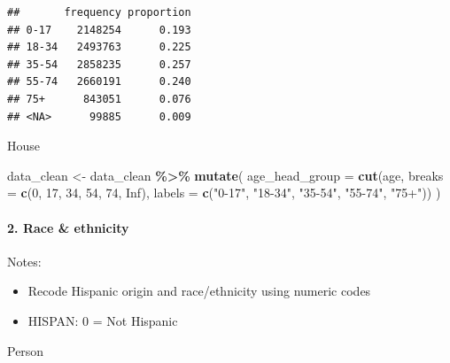 \documentclass[
]{article}
\newenvironment{Shaded}{\begin{snugshade}}{\end{snugshade}}
\newcommand{\AttributeTok}[1]{\textcolor[rgb]{0.13,0.29,0.53}{#1}}
\newcommand{\ConstantTok}[1]{\textcolor[rgb]{0.56,0.35,0.01}{#1}}
\newcommand{\DecValTok}[1]{\textcolor[rgb]{0.00,0.00,0.81}{#1}}
\newcommand{\FunctionTok}[1]{\textcolor[rgb]{0.13,0.29,0.53}{\textbf{#1}}}
\newcommand{\NormalTok}[1]{#1}
\newcommand{\OtherTok}[1]{\textcolor[rgb]{0.56,0.35,0.01}{#1}}
\newcommand{\SpecialCharTok}[1]{\textcolor[rgb]{0.81,0.36,0.00}{\textbf{#1}}}
\newcommand{\StringTok}[1]{\textcolor[rgb]{0.31,0.60,0.02}{#1}}
\providecommand{\tightlist}{%
  \setlength{\itemsep}{0pt}\setlength{\parskip}{0pt}}
\begin{document}
\begin{verbatim}
##       frequency proportion
## 0-17    2148254      0.193
## 18-34   2493763      0.225
## 35-54   2858235      0.257
## 55-74   2660191      0.240
## 75+      843051      0.076
## <NA>      99885      0.009
\end{verbatim}

House

\begin{Shaded}
\begin{Highlighting}[]
\NormalTok{data\_clean }\OtherTok{\textless{}{-}}\NormalTok{ data\_clean }\SpecialCharTok{\%\textgreater{}\%}
  \FunctionTok{mutate}\NormalTok{(}
    \AttributeTok{age\_head\_group =} \FunctionTok{cut}\NormalTok{(age, }\AttributeTok{breaks =} \FunctionTok{c}\NormalTok{(}\DecValTok{0}\NormalTok{, }\DecValTok{17}\NormalTok{, }\DecValTok{34}\NormalTok{, }\DecValTok{54}\NormalTok{, }\DecValTok{74}\NormalTok{, }\ConstantTok{Inf}\NormalTok{), }
                         \AttributeTok{labels =} \FunctionTok{c}\NormalTok{(}\StringTok{"0{-}17"}\NormalTok{, }\StringTok{"18{-}34"}\NormalTok{, }\StringTok{"35{-}54"}\NormalTok{, }\StringTok{"55{-}74"}\NormalTok{, }\StringTok{"75+"}\NormalTok{))}
\NormalTok{  )}
\end{Highlighting}
\end{Shaded}

\paragraph{2. Race \& ethnicity}\label{race-ethnicity}

Notes:

\begin{itemize}
\tightlist
\item
  Recode Hispanic origin and race/ethnicity using numeric codes
\item
  HISPAN: 0 = Not Hispanic
\end{itemize}

Person
\end{document}
